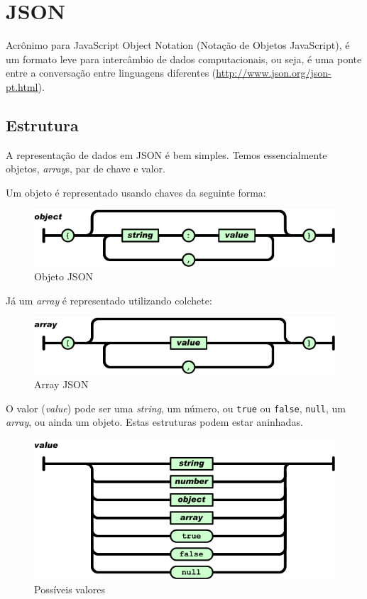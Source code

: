 
\chapter{JSON\label{appx:json}}

Acrônimo para JavaScript Object Notation (Notação de Objetos JavaScript), é um formato leve
para intercâmbio de dados computacionais, ou seja, é uma ponte entre a conversação entre
linguagens diferentes (\url{http://www.json.org/json-pt.html}).

\section*{Estrutura}

A representação de dados em JSON é bem simples. Temos essencialmente objetos, \textit{array}s,
par de chave e valor.

Um objeto é representado usando chaves da seguinte forma:

\begin{figure}[h]
\centering
\includegraphics[scale=0.5]{img/json/object.png}
\caption{Objeto JSON}
\end{figure}

Já um \textit{array} é representado utilizando colchete:

\begin{figure}[h]
\centering
\includegraphics[scale=0.5]{img/json/array.png}
\caption{Array JSON}
\end{figure}

O valor (\textit{value}) pode ser uma \textit{string}, um número, ou \texttt{true} ou \texttt{false},
\texttt{null}, um \textit{array}, ou ainda um objeto. Estas estruturas podem estar aninhadas.

\begin{figure}
\centering
\includegraphics[scale=0.5]{img/json/value.png}
\caption{Possíveis valores}
\end{figure}

